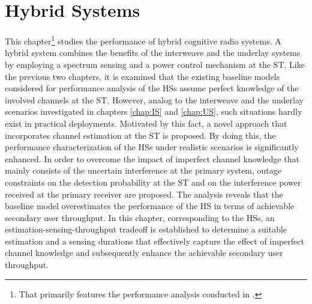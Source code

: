 \chapter{Hybrid Systems} \label{chap:HS}
\vspace{1.0cm}
This chapter\footnote{That primarily features the performance analysis conducted in .} studies the performance of hybrid cognitive radio systems. A hybrid system combines the benefits of the interweave and the underlay systems by employing a spectrum sensing and a power control mechanism at the ST. Like the previous two chapters, it is examined that the existing baseline models considered for performance analysis of the HSs assume perfect knowledge of the involved channels at the ST. However, analog to the interweave and the underlay scenarios investigated in chapters \ref{chap:IS} and \ref{chap:US}, such situations hardly exist in practical deployments. Motivated by this fact, a novel approach that incorporates channel estimation at the ST is proposed. By doing this, the performance characterization of the HSs under realistic scenarios is significantly enhanced. In order to overcome the impact of imperfect channel knowledge that mainly consists of the uncertain interference at the primary system, outage constraints on the detection probability at the ST and on the interference power received at the primary receiver are proposed. The analysis reveals that the baseline model overestimates the performance of the HS in terms of achievable secondary user throughput. In this chapter, corresponding to the HSs, an estimation-sensing-throughput tradeoff is established to determine a suitable estimation and a sensing durations that effectively capture the effect of imperfect channel knowledge and subsequently enhance the achievable secondary user throughput. 

